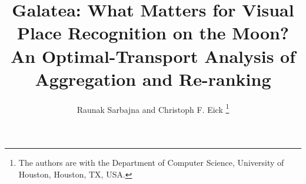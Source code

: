 \documentclass[letterpaper,journal]{IEEEtran}
\begin{document}
\title{Galatea: What Matters for Visual Place Recognition on the Moon? An Optimal-Transport Analysis of
Aggregation and Re-ranking}

\author{Raunak Sarbajna and Christoph F. Eick%
\thanks{The authors are with the Department of Computer Science, University of Houston,
Houston, TX, USA.}}


\maketitle












\end{document}
